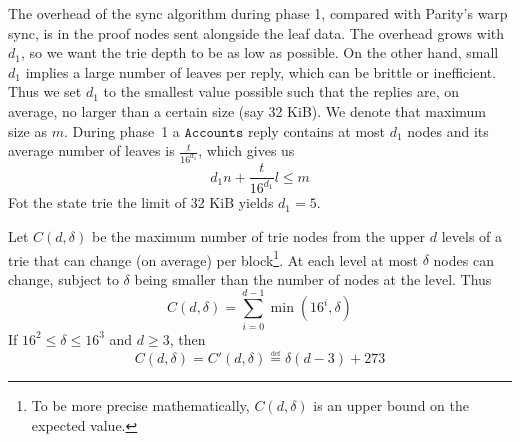 \documentclass{amsart}
\begin{document}
The overhead of the sync algorithm during phase 1, compared with Parity's warp sync, is in the proof nodes sent alongside the leaf data.
The overhead grows with $d_1$, so we want the trie depth to be as low as possible.
On the other hand, small $d_1$ implies a large number of leaves per reply, which can be brittle or inefficient.
Thus we set $d_1$ to the smallest value possible such that the replies are, on average, no larger than a certain size (say 32 KiB).
We denote that maximum size as $m$.
During phase~1 a $\texttt{Accounts}$ reply contains at most $d_1$ nodes
and its average number of leaves is $\frac{t}{16^{d_1}}$,
which gives us
\begin{equation}
    d_1 n + \frac{t}{16^{d_1}} l \leq m
\end{equation}
Fot the state trie the limit of 32 KiB yields $d_1 = 5$.

Let $C(d, \delta)$ be the maximum number of trie nodes from the upper $d$ levels of a trie that can change (on average) per block\footnote{To
be more precise mathematically, $C(d, \delta)$ is an upper bound on the expected value.}.
At each level at most $\delta$ nodes can change, subject to $\delta$ being smaller than the number of nodes at the level.
Thus
\begin{equation}
    C(d, \delta) = \sum_{i=0}^{d-1} \min(16^i, \delta)
\end{equation}
If $16^2 \leq \delta \leq 16^3$ and $d \geq 3$, then
\begin{equation}
    C(d, \delta) = C'(d, \delta) \overset{\underset{\mathrm{def}}{}}{=}
     \delta (d-3) + 273
\end{equation}
\end{document}
